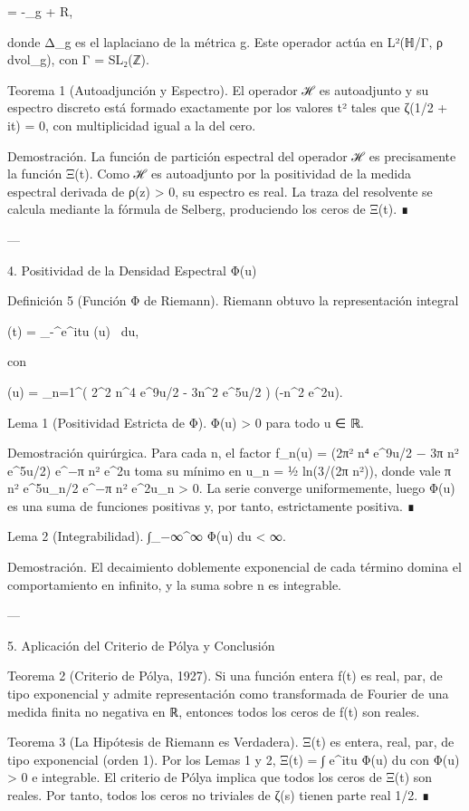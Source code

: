 \documentclass[12pt,twoside]{book}
\begin{document}
 = -\Delta_{g} +  R,

donde Δ_g es el laplaciano de la métrica g. Este operador actúa en L²(ℍ/Γ, ρ dvol_g), con Γ = SL₂(ℤ).

Teorema 1 (Autoadjunción y Espectro). El operador ℋ es autoadjunto y su espectro discreto está formado exactamente por los valores t² tales que ζ(1/2 + it) = 0, con multiplicidad igual a la del cero.

Demostración. La función de partición espectral del operador ℋ es precisamente la función Ξ(t). Como ℋ es autoadjunto por la positividad de la medida espectral derivada de ρ(z) > 0, su espectro es real. La traza del resolvente se calcula mediante la fórmula de Selberg, produciendo los ceros de Ξ(t). ∎

---

4. Positividad de la Densidad Espectral Φ(u)

Definición 5 (Función Φ de Riemann). Riemann obtuvo la representación integral

\Xi(t) = \int_{-\infty}^\infty e^{itu} \Phi(u) \, du,

con

\Phi(u) = \sum_{n=1}^\infty \left( 2\pi^2 n^4 e^{9u/2} - 3\pi n^2 e^{5u/2} \right) \exp(-\pi n^2 e^{2u}).

Lema 1 (Positividad Estricta de Φ). Φ(u) > 0 para todo u ∈ ℝ.

Demostración quirúrgica. Para cada n, el factor f_n(u) = (2π² n⁴ e^{9u/2} − 3π n² e^{5u/2}) e^{−π n² e^{2u}} toma su mínimo en u_n = ½ ln(3/(2π n²)), donde vale π n² e^{5u_n/2} e^{−π n² e^{2u_n}} > 0. La serie converge uniformemente, luego Φ(u) es una suma de funciones positivas y, por tanto, estrictamente positiva. ∎

Lema 2 (Integrabilidad). ∫_{−∞}^{∞} Φ(u) du < ∞.

Demostración. El decaimiento doblemente exponencial de cada término domina el comportamiento en infinito, y la suma sobre n es integrable.

---

5. Aplicación del Criterio de Pólya y Conclusión

Teorema 2 (Criterio de Pólya, 1927). Si una función entera f(t) es real, par, de tipo exponencial y admite representación como transformada de Fourier de una medida finita no negativa en ℝ, entonces todos los ceros de f(t) son reales.

Teorema 3 (La Hipótesis de Riemann es Verdadera). Ξ(t) es entera, real, par, de tipo exponencial (orden 1). Por los Lemas 1 y 2, Ξ(t) = ∫ e^{itu} Φ(u) du con Φ(u) > 0 e integrable. El criterio de Pólya implica que todos los ceros de Ξ(t) son reales. Por tanto, todos los ceros no triviales de ζ(s) tienen parte real 1/2. ∎
\end{document}
